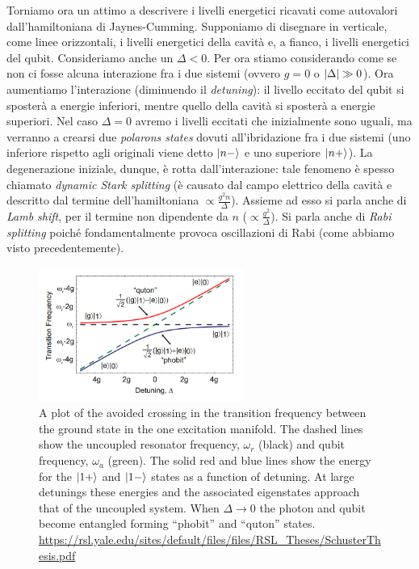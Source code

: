 \vspace{0.5cm}
\newline
\noindent{}
\vspace{0.5cm}
\noindent Torniamo ora un attimo a descrivere i livelli energetici ricavati come autovalori dall'hamiltoniana di Jaynes-Cumming.
Supponiamo di disegnare in verticale, come linee orizzontali, i livelli energetici della cavità e, a fianco, i livelli energetici del qubit. Consideriamo anche un $\Delta < 0$. Per ora stiamo considerando come se non ci fosse alcuna interazione fra i due sistemi (ovvero $g=0$ o $\abs{ \Delta} \gg 0$). Ora aumentiamo l'interazione (diminuendo il \textit{detuning}): il livello eccitato del qubit si sposterà a energie inferiori, mentre quello della cavità si sposterà a energie superiori.
Nel caso $\Delta=0$ avremo i livelli eccitati che inizialmente sono uguali, ma verranno a crearsi due \textit{polarons states} dovuti all'ibridazione fra i due sistemi (uno inferiore rispetto agli originali viene detto $\ket{n-}$ e uno superiore $\ket{n+}$). La degenerazione iniziale, dunque, è rotta dall'interazione: tale fenomeno è spesso chiamato \textit{dynamic Stark splitting} (è causato dal campo elettrico della cavità e descritto dal termine dell'hamiltoniana $\propto \frac{g^2 n}{\Delta}$). Assieme ad esso si parla anche di \textit{Lamb shift}, per il termine non dipendente da $n$ ($\propto \frac{g^2}{\Delta}$). Si parla anche di \textit{Rabi splitting} poiché fondamentalmente provoca oscillazioni di Rabi (come abbiamo visto precedentemente).
\begin{figure}[H]
    \centering
    \includegraphics[width=0.6\textwidth]{images/avoided_crossing.png}
    \caption{A plot of the avoided crossing in the transition frequency between the ground state in the one excitation manifold. The dashed lines show the uncoupled resonator frequency, $\omega_r$ (black) and qubit frequency, $\omega_a$ (green). The solid red and blue lines show the energy for the $\ket{1+}$ and $\ket{1-}$ states as a function of detuning. At large detunings these energies and the associated eigenstates approach that of the uncoupled system. When $\Delta \rightarrow 0$ the photon and qubit become entangled forming “phobit” and “quton” states. \url{https://rsl.yale.edu/sites/default/files/files/RSL_Theses/SchusterThesis.pdf}}
\end{figure}

